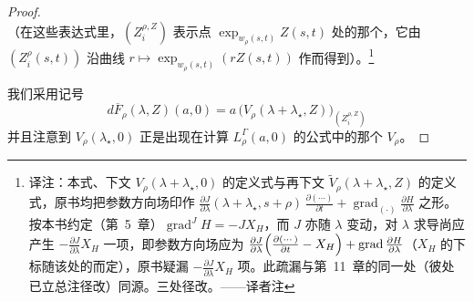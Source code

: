 \begin{proof}
\[\]
（在这些表达式里，$(Z_{i}^{\rho,Z})$ 表示点 $\exp_{w_{\rho}(s,t)}Z(s,t)$ 处的那个\trOrthonormal\trFrame，它由\trFrame{} $(Z_{i}^{\rho}(s,t))$ 沿曲线 $r\mapsto\exp_{w_{\rho}(s,t)}(rZ(s,t))$ 作\trParallelTransport{}而得到）。\footnote{译注：本式、下文 $V_{\rho}(\lambda+\lambda_{\star},0)$ 的定义式与再下文 $\widetilde{V}_{\rho}(\lambda+\lambda_{\star},Z)$ 的定义式，原书均把参数方向场印作 $\frac{\partial J}{\partial\lambda}(\lambda+\lambda_{\star},s+\rho)\,\frac{\partial(\cdots)}{\partial t}+\operatorname{grad}_{(\cdot)}\frac{\partial H}{\partial\lambda}$ 之形。按本书约定（第~5~章）$\operatorname{grad}^{J}H=-JX_{H}$，而 $J$ 亦随 $\lambda$ 变动，对 $\lambda$ 求导尚应产生 $-\frac{\partial J}{\partial\lambda}X_{H}$ 一项，即参数方向场应为 $\frac{\partial J}{\partial\lambda}\Bigl(\frac{\partial(\cdots)}{\partial t}-X_{H}\Bigr)+\operatorname{grad}\frac{\partial H}{\partial\lambda}$（$X_{H}$ 的下标随该处的\trHamiltonian{}而定），原书疑漏 $-\frac{\partial J}{\partial\lambda}X_{H}$ 项。此疏漏与第~11~章的同一处（彼处已立总注径改）同源。三处径改。——译者注}

我们采用记号
\[
d\overline{F}_{\rho}(\lambda,Z)(a,0)=a\,\bigl(V_{\rho}(\lambda+\lambda_{\star},Z)\bigr)_{(Z_{i}^{\rho,Z})}
\]
并且注意到 $V_{\rho}(\lambda_{\star},0)$ 正是出现在计算 $L_{\rho}^{\Gamma}(a,0)$ 的公式中的那个\trVectorField{} $V_{\rho}$。


\end{proof}
